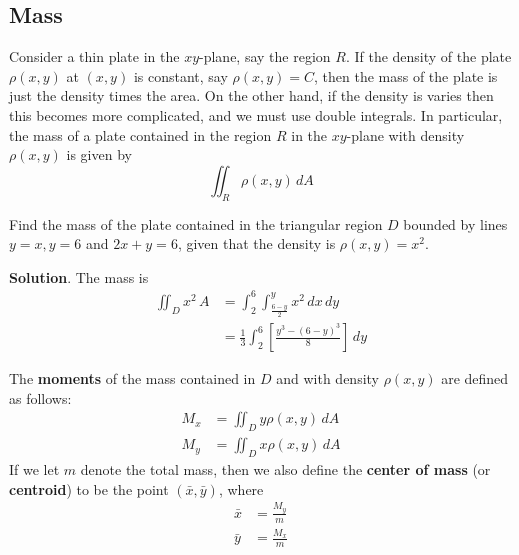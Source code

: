 \documentclass[10pt,]{book}
\newcommand{\terminology}[1]{\textbf{#1}}
\theoremstyle{ptxplainnotitle}
\theoremstyle{ptxplaintitle}
\theoremstyle{ptxplainnotitle}
\theoremstyle{ptxplaintitle}
\theoremstyle{ptxplainnotitle}
\theoremstyle{ptxplaintitle}
\theoremstyle{ptxdefinitionnotitle}
\theoremstyle{ptxdefinitiontitle}
\theoremstyle{ptxdefinitionnotitle}
\theoremstyle{ptxdefinitiontitle}
\theoremstyle{ptxdefinitionnotitle}
\theoremstyle{ptxdefinitiontitle}
\theoremstyle{ptxdefinitionnotitle}
\theoremstyle{ptxdefinitiontitle}
\theoremstyle{ptxdefinitionnotitle}
\theoremstyle{ptxdefinitiontitle}
\numberwithin{equation}{section}
\begin{document}
\subsection[{Mass}]{Mass}\label{subsection-mass}
\hypertarget{p-1153}{}%
Consider a thin plate in the \(xy\)-plane, say the region \(R\). If the density of the plate \(\rho(x,y)\) at \((x,y)\) is constant, say \(\rho(x,y) = C\), then the mass of the plate is just the density times the area. On the other hand, if the density is varies then this becomes more complicated, and we must use double integrals. In particular, the mass of a plate contained in the region \(R\) in the \(xy\)-plane with density \(\rho(x,y)\) is given by%
\begin{equation*}
\iint_{R}\rho(x,y)\,dA
\end{equation*}
%
\begin{example}\label{example-mass-of-a-triangular-plate}
\hypertarget{p-1154}{}%
Find the mass of the plate contained in the triangular region \(D\) bounded by lines \(y=x, y = 6\) and \(2x+y = 6\), given that the density is \(\rho(x,y) = x^{2}\).%
\par\smallskip%
\noindent\textbf{Solution}.\hypertarget{solution-184}{}\quad%
\hypertarget{p-1155}{}%
The mass is%
\begin{align*}
\iint_{D}x^{2}\,A & =  \int_{2}^{6}\int_{\frac{6-y}{2}}^{y}x^{2}\,dx\,dy\\
& = \frac{1}{3}\int_{2}^{6}\left[\frac{y^{3} - (6-y)^{3}}{8}\right]\,dy 
\end{align*}
%
\end{example}
\hypertarget{p-1156}{}%
The \terminology{moments} of the mass contained in \(D\) and with density \(\rho(x,y)\) are defined as follows:%
\begin{align*}
M_{x} & = \iint_{D}y\rho(x,y)\,dA \\
M_{y} & = \iint_{D}x\rho(x,y)\,dA 
\end{align*}
If we let \(m\) denote the total mass, then we also define the \terminology{center of mass} (or \terminology{centroid}) to be the point \((\bar{x},\bar{y})\), where%
\begin{align*}
\bar{x} & = \frac{M_{y}}{m} \\
\bar{y} & = \frac{M_{x}}{m} 
\end{align*}
%
\end{document}
